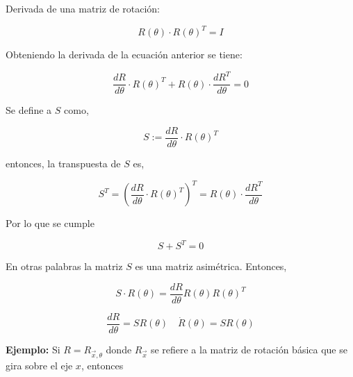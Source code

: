 \documentclass[10pt,a4paper]{article}
\begin{document}
Derivada de una matriz de rotación:

$$
	R(\theta) \cdot R(\theta)^T=I
$$

Obteniendo la derivada de la ecuación anterior se tiene:


$$
	\frac{dR}{d\theta} \cdot R(\theta)^T + R(\theta) \cdot \frac{dR^T}{d\theta} = 0
$$

\begin{multicols}{2}

	Se define a $S$ como,

	$$ S:=\frac{dR}{d\theta} \cdot R(\theta)^T $$

	entonces, la transpuesta de $S$ es,

	$$ S^T = \left( \frac{dR}{d\theta} \cdot R(\theta)^T \right)^T = R(\theta) \cdot \frac{dR^T}{d\theta} $$

	Por lo que se cumple

	$$ S + S^T = 0$$

	\columnbreak
\end{multicols}

En otras palabras la matriz $S$ es una matriz asimétrica. Entonces,

$$ S \cdot R(\theta) = \frac{dR}{d\theta} R(\theta) R(\theta)^T $$

\[
	\boxed{\frac{dR}{d\theta} = S R(\theta)} \quad \dot{R}(\theta) = S R(\theta)
 \]

\vspace{0.5cm}

 \textbf{Ejemplo:} Si $R=R_{\vec{x},\theta}$ donde  $R_{\vec{x}}$ se refiere a la matriz de rotación básica que se gira sobre el eje $x$, entonces
\end{document}

